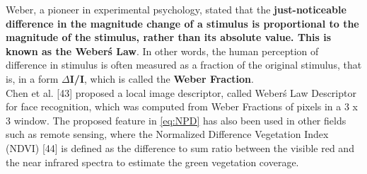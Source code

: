 \documentclass[a4paper,12pt]{article}
\begin{document}
Weber, a pioneer in experimental psychology, stated that the \textbf{just-noticeable difference in the magnitude
change of a stimulus is proportional to the magnitude of the stimulus, rather than its absolute value.
This is known as the Weber\'s Law}. In other words, the human perception of difference in stimulus is often
measured as a fraction of the original stimulus, that is, in a form \textbf{$\Delta$I/I}, which is called 
the \textbf{Weber Fraction}.\\

Chen et al. [43] proposed a local image descriptor, called Weber\'s Law Descriptor for face recognition,
which was computed from Weber Fractions of pixels in a 3 x 3 window. The proposed feature in \eqref{eq:NPD}
has also been used in other fields such as remote sensing, where the Normalized Difference Vegetation
Index (NDVI) [44] is defined as the difference to sum ratio between the visible red and the near infrared
spectra to estimate the green vegetation coverage.\\
\end{document}

